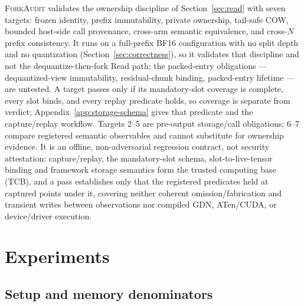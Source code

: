 \documentclass{article}
\newcommand{\method}{\textsc{ForkAudit}}
\begin{document}
\method{} validates the ownership discipline of Section~\ref{sec:read} with
seven targets: frozen identity, prefix immutability, private ownership,
tail-safe COW, bounded host-side call provenance, cross-arm semantic
equivalence, and cross-\(N\) prefix consistency. It runs on a full-prefix BF16
configuration with no split depth and no quantization
(Section~\ref{sec:correctness}), so it validates that discipline and not the
dequantize-then-fork Read path; the packed-entry obligations ---
dequantized-view immutability, residual-chunk binding, packed-entry lifetime
--- are untested. A target passes only if its mandatory-slot coverage is
complete, every slot binds, and every replay predicate holds, so coverage is
separate from verdict; Appendix~\ref{app:storage-schema} gives that predicate
and the capture/replay workflow. Targets 2--5 are pre-output storage/call
obligations; 6--7 compare registered semantic observables and cannot
substitute for ownership evidence. It is an offline, non-adversarial
regression contract, not security attestation: capture/replay, the
mandatory-slot schema, slot-to-live-tensor binding and framework storage
semantics form the trusted computing base (TCB), and a pass establishes only
that the registered predicates held at captured points under it, covering
neither coherent omission/fabrication and transient writes between
observations nor compiled GDN, ATen/CUDA, or device/driver execution.

\section{Experiments}
\label{sec:experiments}
\label{sec:protocol}

\subsection{Setup and memory denominators}
\label{sec:setup}
\end{document}
